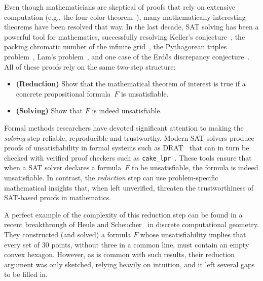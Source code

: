 Even though mathematicians are skeptical of proofs that rely on extensive computation (e.g., the four color theorem~\cite{Walters2004ItAT}),
many mathematically-interesting theorems have been resolved that way.
In the last decade, SAT solving has been a powerful tool for mathematics, successfully resolving
Keller's conjecture~\cite{brakensiek2023resolution},
the packing chromatic number of the infinite grid~\cite{Subercaseaux_Heule_2023},
the Pythagorean triples problem~\cite{Heule_2016},
Lam's problem~\cite{21bright_sat_based_resolution_lams_problem},
and one case of the Erd\H{o}s discrepancy conjecture~\cite{konev2014sat}.
All of these proofs rely on the same two-step structure:
\begin{itemize}
\item \textbf{(Reduction)} Show that the mathematical theorem of interest is true if a concrete propositional formula~$F$ is unsatisfiable.
\item \textbf{(Solving)} Show that $F$ is indeed unsatisfiable.
\end{itemize}


Formal methods researchers have devoted significant attention to making the \emph{solving} step reliable, reproducible and trustworthy.
Modern SAT solvers produce proofs of unsatisfiability in formal systems
such as DRAT~\cite{drat-trim14}
that can in turn be checked with verified proof checkers
such as \texttt{cake\_lpr}~\cite{tanVerifiedPropagationRedundancy2023}. 
These tools ensure that when a SAT solver declares a formula~$F$ to be unsatisfiable, the formula is indeed unsatisfiable.
In contrast, the \emph{reduction} step can use problem-specific mathematical insights that, when left unverified, threaten the trustworthiness of SAT-based proofs in mathematics. 

A perfect example of the complexity of this reduction step can be found in a recent breakthrough of Heule and Scheucher~\cite{emptyHexagonNumber} in discrete computational geometry. 
They constructed (and solved) a formula $F$ whose unsatisfiability implies that every set of 30 points, without three in a common line, must contain an empty convex hexagon.
However, as is common with such results, their reduction argument was only sketched, relying heavily on intuition,
and it left several gaps to be filled in.
 

